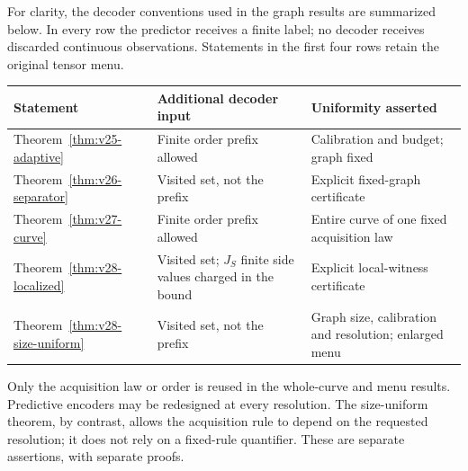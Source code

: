 For clarity, the decoder conventions used in the graph results are
summarized below. In every row the predictor receives a finite label;
no decoder receives discarded continuous observations. Statements in
the first four rows retain the original tensor menu.
\begin{center}
\small
\begin{tabular}{p{}p{}p{}}
\toprule
Statement & Additional decoder input & Uniformity asserted\\
\midrule
Theorem~\ref{thm:v25-adaptive} & Finite order prefix allowed & Calibration and budget; graph fixed\\
Theorem~\ref{thm:v26-separator} & Visited set, not the prefix & Explicit fixed-graph certificate\\
Theorem~\ref{thm:v27-curve} & Finite order prefix allowed & Entire curve of one fixed acquisition law\\
Theorem~\ref{thm:v28-localized} & Visited set; $J_S$ finite side values charged in the bound & Explicit local-witness certificate\\
Theorem~\ref{thm:v28-size-uniform} & Visited set, not the prefix & Graph size, calibration and resolution; enlarged menu\\
\bottomrule
\end{tabular}
\end{center}
Only the acquisition law or order is reused in the whole-curve and menu
results. Predictive encoders may be redesigned at every resolution.
The size-uniform theorem, by contrast, allows the acquisition rule to
depend on the requested resolution; it does not rely on a fixed-rule
quantifier. These are separate assertions, with separate proofs.
